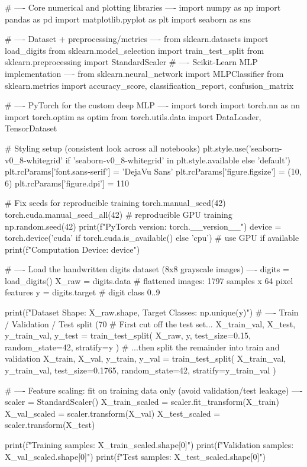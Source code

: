 
\begin{codebox}[title={Core numerical and plotting libraries}]
# ---- Core numerical and plotting libraries ----
import numpy as np
import pandas as pd
import matplotlib.pyplot as plt
import seaborn as sns

# ---- Dataset + preprocessing/metrics ----
from sklearn.datasets import load_digits
from sklearn.model_selection import train_test_split
from sklearn.preprocessing import StandardScaler
# ---- Scikit-Learn MLP implementation ----
from sklearn.neural_network import MLPClassifier
from sklearn.metrics import accuracy_score, classification_report, confusion_matrix

# ---- PyTorch for the custom deep MLP ----
import torch
import torch.nn as nn
import torch.optim as optim
from torch.utils.data import DataLoader, TensorDataset

# Styling setup (consistent look across all notebooks)
plt.style.use('seaborn-v0_8-whitegrid' if 'seaborn-v0_8-whitegrid' in plt.style.available else 'default')
plt.rcParams['font.sans-serif'] = 'DejaVu Sans'
plt.rcParams['figure.figsize'] = (10, 6)
plt.rcParams['figure.dpi'] = 110

# Fix seeds for reproducible training
torch.manual_seed(42)
torch.cuda.manual_seed_all(42)  # reproducible GPU training
np.random.seed(42)
print(f"PyTorch version: {torch.__version__}")
device = torch.device('cuda' if torch.cuda.is_available() else 'cpu')  # use GPU if available
print(f"Computation Device: {device}")

# ---- Load the handwritten digits dataset (8x8 grayscale images) ----
digits = load_digits()
X_raw = digits.data      # flattened images: 1797 samples x 64 pixel features
y = digits.target        # digit class 0..9

print(f"Dataset Shape: {X_raw.shape}, Target Classes: {np.unique(y)}")
# ---- Train / Validation / Test split (70%
# First cut off the test set...
X_train_val, X_test, y_train_val, y_test = train_test_split(
    X_raw, y, test_size=0.15, random_state=42, stratify=y
)
# ...then split the remainder into train and validation
X_train, X_val, y_train, y_val = train_test_split(
    X_train_val, y_train_val, test_size=0.1765, random_state=42, stratify=y_train_val
)

# ---- Feature scaling: fit on training data only (avoid validation/test leakage) ----
scaler = StandardScaler()
X_train_scaled = scaler.fit_transform(X_train)
X_val_scaled = scaler.transform(X_val)
X_test_scaled = scaler.transform(X_test)

print(f"Training samples:   {X_train_scaled.shape[0]}")
print(f"Validation samples: {X_val_scaled.shape[0]}")
print(f"Test samples:       {X_test_scaled.shape[0]}")
\end{codebox}

